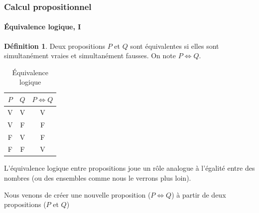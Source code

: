 \documentclass[10pt,notheorems]{beamer}
\theoremstyle{plain}
\theoremstyle{definition} %
\newtheorem{definition}{Définition}
\begin{document}
\begin{frame}
  \frametitle{Calcul propositionnel}
  \framesubtitle{Équivalence logique, I}
  \hypertarget{slide_equivalence_logique_1}{}

  \begin{definition}\label{def:equivalence}
    Deux propositions $P$ et $Q$ sont équivalentes si elles sont
    simultanément vraies et simultanément fausses. On note
    $P \Leftrightarrow Q$.
  \end{definition}


  \begin{table}[H]

    \centering
    \begin{tabular}[H]{|cc|c|}
      \hline
      $P$ & $Q$ & $P \Leftrightarrow Q$\\ \hline
      V & V & V \\
      V & F & F \\
      F & V & F \\
      F & F & V \\
      \hline\hline
    \end{tabular}
    \caption{Équivalence logique}
    \label{tab:equivalence}
  \end{table}

  \bigskip

  L'équivalence logique entre propositions joue un rôle analogue à
  l'égalité entre des nombres (ou des ensembles comme nous le verrons plus loin).\newline

  Nous venons de créer une nouvelle proposition
  ($P \Leftrightarrow Q$) à partir de deux propositions ($P$ et $Q$)

\end{frame}
\end{document}
